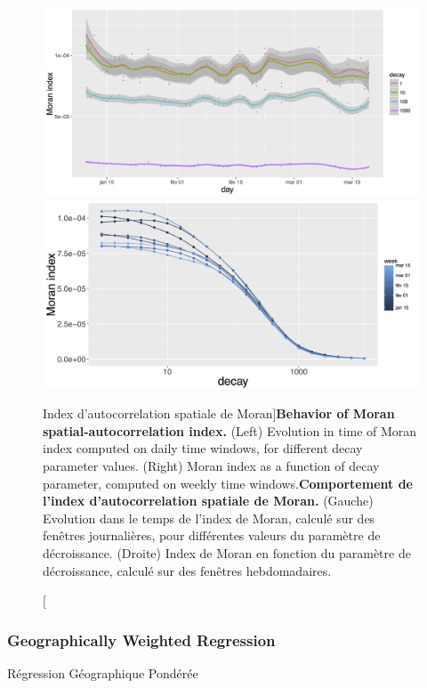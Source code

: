 \begin{figure}
\centering
\includegraphics[width=\textwidth]{Figures/EnergyPrice/moran_days}\\
\includegraphics[width=\textwidth]{Figures/EnergyPrice/moran_decay_weeks}
\caption[Moran spatial-autocorrelation index][Index d'autocorrelation spatiale de Moran]{\textbf{Behavior of Moran spatial-autocorrelation index.} (Left) Evolution in time of Moran index computed on daily time windows, for different decay parameter values. (Right) Moran index as a function of decay parameter, computed on weekly time windows.}{\textbf{Comportement de l'index d'autocorrelation spatiale de Moran.} (Gauche) Evolution dans le temps de l'index de Moran, calculé sur des fenêtres journalières, pour différentes valeurs du paramètre de décroissance. (Droite) Index de Moran en fonction du paramètre de décroissance, calculé sur des fenêtres hebdomadaires.}
\label{fig:moran}
\end{figure}

\subsubsection{Geographically Weighted Regression}{Régression Géographique Pondérée}


